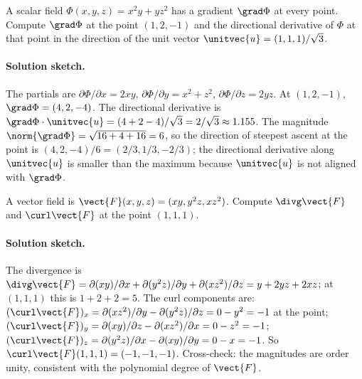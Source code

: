 \begin{exercise}
A scalar field $\Phi(x, y, z) = x^{2} y + y z^{2}$ has a gradient
$\grad\Phi$ at every point. Compute $\grad\Phi$ at the point
$(1, 2, -1)$ and the directional derivative of $\Phi$ at that
point in the direction of the unit vector $\unitvec{u} =
(1, 1, 1)/\sqrt{3}$.

\paragraph{Solution sketch.} The partials are $\partial\Phi/
\partial x = 2 x y$, $\partial\Phi/\partial y = x^{2} + z^{2}$,
$\partial\Phi/\partial z = 2 y z$. At $(1, 2, -1)$, $\grad\Phi =
(4, 2, -4)$. The directional derivative is $\grad\Phi\cdot
\unitvec{u} = (4 + 2 - 4)/\sqrt{3} = 2/\sqrt{3} \approx 1.155$.
The magnitude $\norm{\grad\Phi} = \sqrt{16 + 4 + 16} = 6$, so the
direction of steepest ascent at the point is $(4, 2, -4)/6 =
(2/3, 1/3, -2/3)$; the directional derivative along $\unitvec{u}$
is smaller than the maximum because $\unitvec{u}$ is not aligned
with $\grad\Phi$.
\end{exercise}

\begin{exercise}
A vector field is $\vect{F}(x, y, z) = (xy, y^{2} z, x z^{2})$.
Compute $\divg\vect{F}$ and $\curl\vect{F}$ at the point
$(1, 1, 1)$.

\paragraph{Solution sketch.} The divergence is $\divg\vect{F} =
\partial(xy)/\partial x + \partial(y^{2}z)/\partial y + \partial
(xz^{2})/\partial z = y + 2 y z + 2 x z$; at $(1, 1, 1)$ this is
$1 + 2 + 2 = 5$. The curl components are: $(\curl\vect{F})_{x} =
\partial(xz^{2})/\partial y - \partial(y^{2}z)/\partial z = 0 -
y^{2} = -1$ at the point; $(\curl\vect{F})_{y} = \partial(xy)/
\partial z - \partial(xz^{2})/\partial x = 0 - z^{2} = -1$;
$(\curl\vect{F})_{z} = \partial(y^{2}z)/\partial x - \partial(xy)/
\partial y = 0 - x = -1$. So $\curl\vect{F}(1, 1, 1) = (-1, -1, -1)$.
Cross-check: the magnitudes are order unity, consistent with the
polynomial degree of $\vect{F}$.
\end{exercise}

